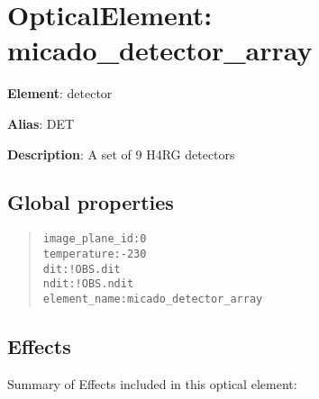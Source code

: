 

\section{OpticalElement: \textquotedbl{}micado\_detector\_array\textquotedbl{}%
  \label{opticalelement-micado-detector-array}%
}

\textbf{Element}: detector

\textbf{Alias}: DET

\textbf{Description}: A set of 9 H4RG detectors


\subsection{Global properties%
  \label{global-properties}%
}

\begin{quote}
\begin{alltt}
image_plane_id : 0
   temperature : -230
           dit : !OBS.dit
          ndit : !OBS.ndit
  element_name : micado_detector_array
\end{alltt}
\end{quote}


\subsection{Effects%
  \label{effects}%
}

Summary of Effects included in this optical element:


